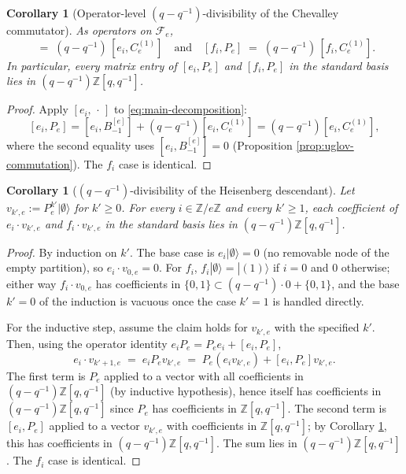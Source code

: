 \documentclass[11pt]{article}
\newtheorem{corollary}[theorem]{Corollary}
\theoremstyle{definition}
\newcommand{\Fock}{\mathcal{F}}
\newcommand{\vke}{v_{k',e}}
\newcommand{\Ce}{C_e^{(1)}}
\newcommand{\Bmi}{B_{-1}^{[e]}}
\begin{document}
\begin{corollary}[Operator-level $(q - q^{-1})$-divisibility of the Chevalley commutator]
\label{cor:C4-commutator}
As operators on $\Fock_e$,
\begin{equation}
    [e_i, P_e] \;=\; (q - q^{-1}) \, [e_i, \Ce] \quad \text{and} \quad [f_i, P_e] \;=\; (q - q^{-1}) \, [f_i, \Ce].
\end{equation}
In particular, every matrix entry of $[e_i, P_e]$ and $[f_i, P_e]$ in the standard
basis lies in $(q - q^{-1}) \mathbb Z[q, q^{-1}]$.
\end{corollary}

\begin{proof}
Apply $[e_i, \,\cdot\,]$ to \eqref{eq:main-decomposition}:
\[
    [e_i, P_e] = [e_i, \Bmi] + (q - q^{-1}) [e_i, \Ce] = (q - q^{-1}) [e_i, \Ce],
\]
where the second equality uses $[e_i, \Bmi] = 0$ (Proposition \ref{prop:uglov-commutation}).
The $f_i$ case is identical.
\end{proof}

\begin{corollary}[$(q - q^{-1})$-divisibility of the Heisenberg descendant]
\label{cor:C4-vke}
Let $\vke := P_e^{k'} |\emptyset\rangle$ for $k' \ge 0$. For every $i \in \mathbb Z/e\mathbb Z$
and every $k' \ge 1$, each coefficient of $e_i \cdot \vke$ and $f_i \cdot \vke$
in the standard basis lies in $(q - q^{-1}) \mathbb Z[q, q^{-1}]$.
\end{corollary}

\begin{proof}
By induction on $k'$. The base case is
$e_i |\emptyset\rangle = 0$ (no removable node of the empty partition), so
$e_i \cdot v_{0, e} = 0$. For $f_i$, $f_i |\emptyset\rangle = |(1)\rangle$
if $i = 0$ and $0$ otherwise; either way $f_i \cdot v_{0, e}$ has coefficients
in $\{0, 1\} \subset (q - q^{-1}) \cdot 0 + \{0, 1\}$, and the base $k' = 0$
of the induction is vacuous once the case $k' = 1$ is handled directly.

For the inductive step, assume the claim holds for $\vke$ with the specified
$k'$. Then, using the operator identity $e_i P_e = P_e e_i + [e_i, P_e]$,
\[
    e_i \cdot v_{k'+1, e} \;=\; e_i P_e \vke \;=\; P_e (e_i \vke) + [e_i, P_e] \vke.
\]
The first term is $P_e$ applied to a vector with all coefficients in
$(q - q^{-1}) \mathbb Z[q, q^{-1}]$ (by inductive hypothesis), hence itself has
coefficients in $(q - q^{-1}) \mathbb Z[q, q^{-1}]$ since $P_e$ has coefficients
in $\mathbb Z[q, q^{-1}]$. The second term is $[e_i, P_e]$ applied to a vector
$\vke$ with coefficients in $\mathbb Z[q, q^{-1}]$; by Corollary
\ref{cor:C4-commutator}, this has coefficients in $(q - q^{-1}) \mathbb Z[q, q^{-1}]$.
The sum lies in $(q - q^{-1}) \mathbb Z[q, q^{-1}]$. The $f_i$ case is identical.
\end{proof}
\end{document}
